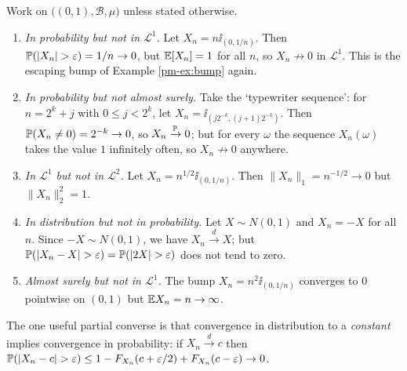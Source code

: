 \documentclass[a4paper]{scrartcl}
\newcommand{\cB}{\mathcal{B}}
\newcommand{\cL}{\mathcal{L}}
\newcommand{\ind}{\ii}
\begin{document}
\begin{center}
\end{center}

\begin{example}\label{ex:mode-counter}
	Work on $\big((0,1),\cB,\mu\big)$ unless stated otherwise.
	\begin{enumerate}[label=(\roman*)]
		\item \emph{In probability but not in $\cL^1$.} Let $X_n = n\ind_{(0,1/n)}$. Then $\PP(|X_n|>\varepsilon)=1/n\to0$, but $\mathbb{E}[X_n]=1$ for all $n$, so $X_n \not\to0$ in $\cL^1$. This is the escaping bump of Example \ref{pm-ex:bump} again.
		\item \emph{In probability but not almost surely.} Take the `typewriter sequence': for $n = 2^k + j$ with $0 \leq j < 2^k$, let $X_n = \ind_{(j2^{-k},(j+1)2^{-k})}$. Then $\mathbb{P}(X_n \neq 0)=2^{-k}\to0$, so $X_n \xrightarrow{\mathbb{P}}0$; but for every $\omega$ the sequence $X_n(\omega)$ takes the value $1$ infinitely often, so $X_n \not\to 0$ anywhere.
		\item \emph{In $\cL^1$ but not in $\cL^2$.} Let $X_n = n^{1/2}\ind_{(0,1/n)}$. Then $\|X_n\|_1 = n^{-1/2}\to0$ but $\|X_n\|_2^2 = 1$.
		\item \emph{In distribution but not in probability.} Let $X \sim N(0,1)$ and $X_n = -X$ for all $n$. Since $-X\sim N(0,1)$, we have $X_n \xrightarrow{d}X$; but $\PP(|X_n - X|>\varepsilon)=\PP(|2X|>\varepsilon)$ does not tend to zero.
		\item \emph{Almost surely but not in $\cL^1$.} The bump $X_n = n^2\ind_{(0,1/n)}$ converges to $0$ pointwise on $(0,1)$ but $\mathbb{E} X_n = n \to\infty$.
	\end{enumerate}
\end{example}

The one useful partial converse is that convergence in distribution to a \emph{constant} implies convergence in probability: if $X_n \xrightarrow{d} c$ then $\PP(|X_n - c|>\varepsilon)\leq 1 - F_{X_n}(c+\varepsilon/2)+F_{X_n}(c-\varepsilon)\to 0$.
\end{document}
